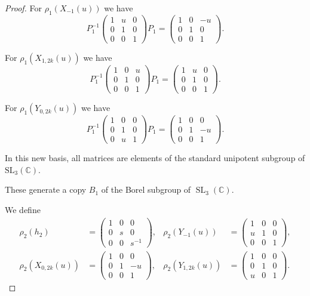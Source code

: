 \documentclass[10pt,a4paper]{amsart}
\newcommand{\C}{{\mathbb C}}
\DeclareMathOperator{\SL}{SL}
\begin{document}
{\begin{proof}
{ For $\rho_1(X_{-1}(u))$} we have
\[
P_1^{-1} \begin{pmatrix} 1 & u & 0 \\ 0 & 1 & 0 \\ 0 & 0 & 1 \end{pmatrix} P_1 = \begin{pmatrix} 1 & 0 & -u \\ 0 & 1 & 0 \\ 0 & 0 & 1 \end{pmatrix}.
\]

{For $\rho_1(X_{1,2k}(u))$} we have
\[
P_1^{-1} \begin{pmatrix} 1 & 0 & u \\ 0 & 1 & 0 \\ 0 & 0 & 1 \end{pmatrix} P_1 = \begin{pmatrix} 1 & u & 0 \\ 0 & 1 & 0 \\ 0 & 0 & 1 \end{pmatrix}.
\]

{For $\rho_1(Y_{0,2k}(u))$} we have
\[
P_1^{-1} \begin{pmatrix} 1 & 0 & 0 \\ 0 & 1 & 0 \\ 0 & u & 1 \end{pmatrix} P_1 = \begin{pmatrix} 1 & 0 & 0 \\ 0 & 1 & -u \\ 0 & 0 & 1 \end{pmatrix}.
\]

In this new basis, all matrices are elements of the standard unipotent subgroup of $\mathrm{SL}_3(\mathbb{C})$.


These generate a copy $B_1$ of the Borel subgroup of $\SL_3(\C)$.



We define
\begin{align*}
\rho_2(h_2) &= \begin{pmatrix}1&0&0\\ 0&s&0\\ 0&0&s^{-1}\end{pmatrix}, &
\rho_2(Y_{-1}(u)) &= \begin{pmatrix}1&0&0\\ u&1&0\\ 0&0&1\end{pmatrix}, \\
\rho_2(X_{0,2k}(u)) &= \begin{pmatrix}1&0&0\\ 0&1&-u\\ 0&0&1\end{pmatrix}, &
\rho_2(Y_{1,2k}(u)) &= \begin{pmatrix}1&0&0\\ 0&1&0\\ u&0&1\end{pmatrix}.
\end{align*}


\end{proof}}
\end{document}
